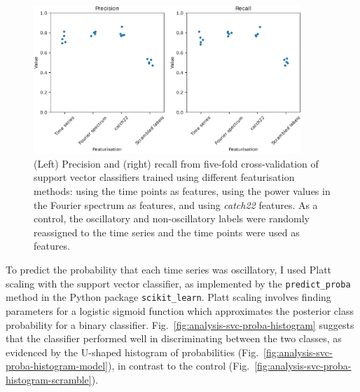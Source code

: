 \begin{figure}
  \centering
  \includegraphics[width=0.9\textwidth]{svm_feat_compare_edit.pdf}
  \caption[
    Precision and recall from five-fold cross-validation of support vector classifiers trained using different featurisation methods.
  ]{
    (Left) Precision and (right) recall from five-fold cross-validation of support vector classifiers trained using different featurisation methods:
    using the time points as features,
    using the power values in the Fourier spectrum as features,
    and using \emph{catch22} features.
    As a control, the oscillatory and non-oscillatory labels were randomly reassigned to the time series and the time points were used as features.
  }
  \label{fig:analysis-precision-recall}
\end{figure}


To predict the probability that each time series was oscillatory, I used Platt scaling  \parencite{plattProbabilisticOutputsSupport1999} with the support vector classifier, as implemented by the \texttt{predict\_proba} method in the Python package \texttt{scikit\_learn}.
Platt scaling involves finding parameters for a logistic sigmoid function which approximates the posterior class probability for a binary classifier.
Fig.\ \ref{fig:analysis-svc-proba-histogram} suggests that the classifier performed well in discriminating between the two classes, as evidenced by the U-shaped histogram of probabilities (Fig.\ \ref{fig:analysis-svc-proba-histogram-model}), in contrast to the control (Fig.\ \ref{fig:analysis-svc-proba-histogram-scramble}).

